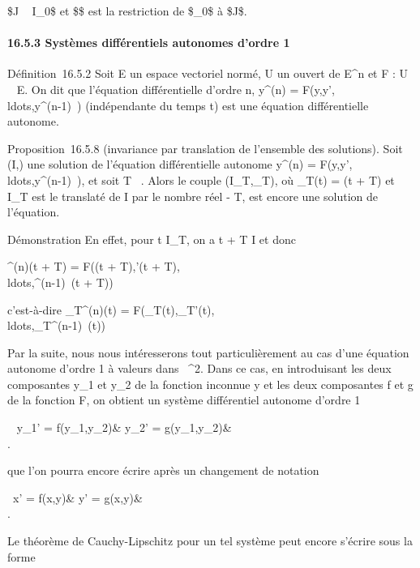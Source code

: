 \documentclass[]{article}
\begin{document}
\text\$J \subset~ I\_0\$ et \$\psi\$ est la restriction
de \$\phi\_0\$ à \$J\$.

\paragraph{16.5.3 Systèmes différentiels autonomes d'ordre 1}

Définition~16.5.2 Soit E un espace vectoriel normé, U un ouvert de
E^n et F : U \rightarrow~ E. On dit que l'équation différentielle
d'ordre n, y^(n) =
F(y,y',\\ldots,y^(n-1)~)
(indépendante du temps t) est une équation différentielle autonome.

Proposition~16.5.8 (invariance par translation de l'ensemble des
solutions). Soit (I,\phi) une solution de l'équation différentielle
autonome y^(n) =
F(y,y',\\ldots,y^(n-1)~),
et soit T \in {}~. Alors le couple (I\_T,\phi\_T), où
\phi\_T(t) = \phi(t + T) et I\_T est le translaté de I par le
nombre réel - T, est encore une solution de l'équation.

Démonstration En effet, pour t \in I\_T, on a t + T \in I et donc

\phi^(n)(t + T) = F(\phi(t + T),\phi'(t +
T),\\ldots,\phi^(n-1)~(t
+ T))

c'est-à-dire \phi\_T^(n)(t) =
F(\phi\_T(t),\phi\_T'(t),\\ldots,\phi\_T^(n-1)~(t))

Par la suite, nous nous intéresserons tout particulièrement au cas d'une
équation autonome d'ordre 1 à valeurs dans ~^2. Dans ce cas,
en introduisant les deux composantes y\_1 et y\_2 de la
fonction inconnue y et les deux composantes f et g de la fonction F, on
obtient un système différentiel autonome d'ordre 1

\left \ \cases
y\_1' = f(y\_1,y\_2)& \cr
y\_2' = g(y\_1,y\_2)&\\ 
\right .

que l'on pourra encore écrire après un changement de notation

\left \ \cases x' =
f(x,y)& \cr y' = g(x,y)&\\  \right .

Le théorème de Cauchy-Lipschitz pour un tel système peut encore s'écrire
sous la forme
\end{document}
